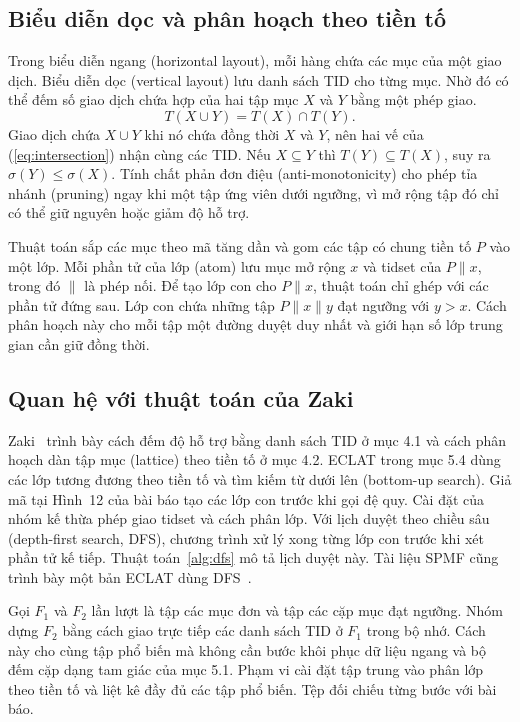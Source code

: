 \subsection{Biểu diễn dọc và phân hoạch theo tiền tố}
Trong biểu diễn ngang (horizontal layout), mỗi hàng chứa các mục của một
giao dịch. Biểu diễn dọc (vertical layout) lưu danh sách TID cho từng
mục. Nhờ đó có thể đếm số giao dịch chứa hợp của hai tập mục $X$ và $Y$
bằng một phép giao.
\begin{equation}
 T(X\cup Y)=T(X)\cap T(Y).
 \label{eq:intersection}
\end{equation}
Giao dịch chứa $X\cup Y$ khi nó chứa đồng thời $X$ và $Y$, nên hai vế của
(\ref{eq:intersection}) nhận cùng các TID. Nếu $X\subseteq Y$ thì
$T(Y)\subseteq T(X)$, suy ra $\sigma(Y)\le\sigma(X)$. Tính chất phản đơn
điệu (anti-monotonicity) cho phép tỉa nhánh (pruning) ngay khi một tập ứng
viên dưới ngưỡng, vì mở rộng tập đó chỉ có thể giữ nguyên hoặc giảm độ hỗ trợ.

Thuật toán sắp các mục theo mã tăng dần và gom các tập có chung tiền tố $P$
vào một lớp. Mỗi phần tử của lớp (atom) lưu mục mở rộng $x$ và tidset của
$P\mathbin{\|}x$, trong đó $\|$ là phép nối. Để tạo lớp con cho
$P\mathbin{\|}x$, thuật toán chỉ ghép với các phần tử đứng sau. Lớp con
chứa những tập $P\mathbin{\|}x\mathbin{\|}y$ đạt ngưỡng với $y>x$. Cách
phân hoạch này cho mỗi tập một đường duyệt duy nhất và giới hạn số lớp
trung gian cần giữ đồng thời.

\subsection{Quan hệ với thuật toán của Zaki}
Zaki~\cite{zaki2000} trình bày cách đếm độ hỗ trợ bằng danh sách TID ở mục
4.1 và cách phân hoạch dàn tập mục (lattice) theo tiền tố ở mục 4.2. ECLAT
trong mục 5.4 dùng các lớp tương đương theo tiền tố và tìm kiếm từ dưới
lên (bottom-up search). Giả mã tại Hình~12 của bài báo tạo các lớp con
trước khi gọi đệ quy. Cài đặt của nhóm kế thừa phép giao tidset và cách
phân lớp. Với lịch duyệt theo chiều sâu (depth-first search, DFS),
chương trình xử lý xong từng lớp con trước khi xét phần tử kế tiếp.
Thuật toán~\ref{alg:dfs} mô tả lịch duyệt này. Tài liệu SPMF cũng trình
bày một bản ECLAT dùng DFS~\cite{spmf}.

Gọi $F_1$ và $F_2$ lần lượt là tập các mục đơn và tập các cặp mục đạt
ngưỡng. Nhóm dựng $F_2$ bằng cách giao trực tiếp các danh sách TID ở $F_1$
trong bộ nhớ. Cách này cho cùng tập phổ biến mà không cần bước khôi phục
dữ liệu ngang và bộ đếm cặp dạng tam giác của mục 5.1. Phạm vi cài đặt tập
trung vào phân lớp theo tiền tố và liệt kê đầy đủ các tập phổ biến.
Tệp  đối chiếu từng bước với bài báo.

